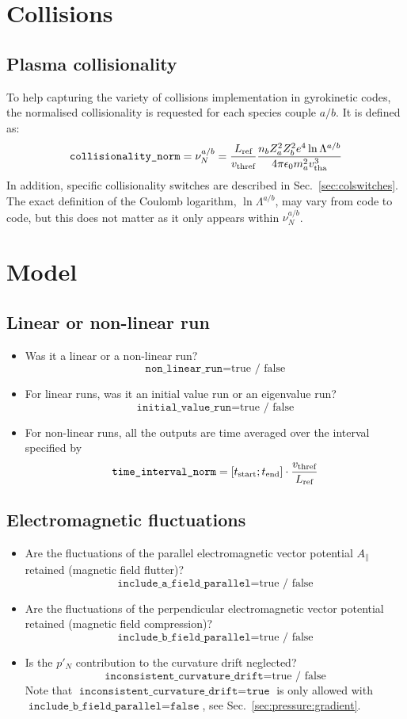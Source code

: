 \documentclass[a4paper]{report}
\begin{document}
\section{Collisions}
\subsection{Plasma collisionality} \label{sec:collisionality}
To help capturing the variety of collisions implementation in gyrokinetic codes, the normalised collisionality is requested for each species couple $a/b$. It is defined as:
$$\texttt{collisionality\_norm}=\nu^{a/b}_N=\frac{L_{\textrm{ref}}}{v_\textrm{thref}}\frac{n_bZ_a^2Z_b^2e^4\ln \Lambda^{a/b}}{4\pi\epsilon_0m_a^2v_\textrm{tha}^3}$$
In addition, specific collisionality switches are described in Sec.~\ref{sec:colswitches}. The exact definition of the Coulomb logarithm, $\ln \Lambda^{a/b}$, may vary from code to code, but this does not matter as it only appears within $\nu^{a/b}_N$.\\


\section{Model} 
\subsection{Linear or non-linear run} \label{sec:runtype}
\begin{itemize}
    \item Was it a linear or a non-linear run?
	$$\texttt{non\_linear\_run}= \textrm{true / false}$$     
    \item For linear runs, was it an initial value run or an eigenvalue run?
	$$\texttt{initial\_value\_run}= \textrm{true / false}$$         
    \item For non-linear runs, all the outputs are time averaged over the interval specified by
    $$\texttt{time\_interval\_norm}=[t_\textrm{start} ; t_\textrm{end}]\cdot\frac{v_\textrm{thref}}{L_{\textrm{ref}}}$$
\end{itemize}
\subsection{Electromagnetic fluctuations} \label{em:switches}
\begin{itemize}
	\item Are the fluctuations of the parallel electromagnetic vector potential $A_\parallel$ retained (magnetic field flutter)? 
	$$\texttt{include\_a\_field\_parallel}= \textrm{true / false}$$ 
	\item Are the fluctuations of the perpendicular electromagnetic vector potential retained (magnetic field compression)?
	$$\texttt{include\_b\_field\_parallel}= \textrm{true / false}$$ 
	\item Is the $p'_N$ contribution to the curvature drift neglected? 
	$$\texttt{inconsistent\_curvature\_drift}= \textrm{true / false}$$
	Note that $\texttt{inconsistent\_curvature\_drift}= \texttt{true}$ is only allowed with $\texttt{include\_b\_field\_parallel}= \texttt{false}$, see Sec.~\ref{sec:pressure:gradient}.
\end{itemize}
\end{document}

